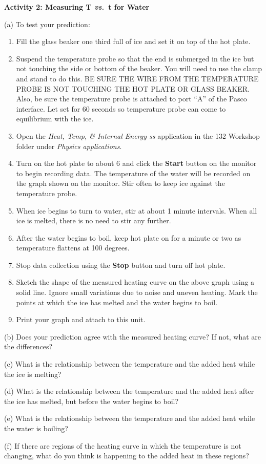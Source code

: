 \newpage

\textbf{Activity 2: Measuring T \textit{vs.}~t for Water} 

(a) To test your prediction: 

\begin{enumerate}
\item Fill the glass beaker one third full of ice and set it on top of the hot plate.
\item Suspend the temperature probe so that the end is submerged in the ice but not touching the side or bottom of the beaker. You will need to use the clamp and stand to do this. BE SURE THE WIRE FROM THE TEMPERATURE PROBE IS NOT TOUCHING THE HOT PLATE OR GLASS BEAKER. Also, be sure the temperature probe is attached to port ``A'' of the Pasco interface. Let set for 60 seconds so temperature probe can come to equilibrium with the ice.
\item Open the \textit{Heat, Temp, \& Internal Energy ss} application in the
132 Workshop folder under \textit{Physics applications}.
\item Turn on the hot plate to about 6 and click the
\textbf{Start} button on the monitor to begin recording data. The temperature of the water will be recorded on the graph shown on the monitor. Stir often to keep ice against the temperature probe.
\item When ice begins to turn to water, stir at about 1 minute intervals. When all ice is melted, there is no need to stir any further.
\item After the water begins to boil, keep hot plate on for a minute or two as temperature flattens at 100 degrees.
\item Stop data collection using the \textbf{Stop} button and turn off hot plate.
\item Sketch the shape of the measured heating curve on the above graph
using a solid line. Ignore small variations due to noise and uneven
heating. Mark the points at which the ice has melted and the water
begins to boil.
\item Print your graph and attach to this unit.
\end{enumerate}
(b) Does your prediction agree with the measured heating curve? If
not, what are the differences?
\vspace{15mm}

(c) What is the relationship between the temperature and the added
heat while the ice is melting?
\vspace{15mm}

(d) What is the relationship between the temperature and the added
heat after the ice has melted, but before the water begins to boil?
\vspace{15mm}

(e) What is the relationship between the temperature and the added
heat while the water is boiling?
\vspace{15mm}

(f) If there are regions of the heating curve in which the temperature
is not changing, what do you think is happening to the added heat
in these regions?\vspace{20mm}

